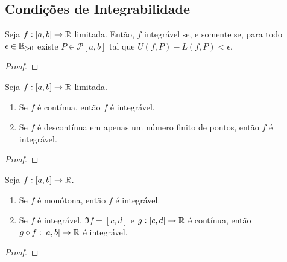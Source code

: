 \subsection{Condições de Integrabilidade}

\begin{theorem}
    Seja $f:[a,b] \to \mathbb{R}$ limitada. Então, $f$ integrável se, e somente se, para todo $\epsilon \in \mathbb{R}_{>0}$ existe $P \in \mathcal{P}[a,b]$ tal que $U(f,P) - L(f,P) < \epsilon$.
\end{theorem}

\begin{proof}
    \blackproof
\end{proof}

\begin{theorem}
    Seja $f:[a,b] \to \mathbb{R}$ limitada.
        \begin{enumerate}[leftmargin=*, align=left, label=\textbf{(\alph*)}]
            \item Se $f$ é contínua, então $f$ é integrável.
            \item Se $f$ é descontínua em apenas um número finito de pontos, então $f$ é integrável.
        \end{enumerate}
\end{theorem}

\begin{proof}
    \blackproof
\end{proof}

\begin{proposition}
    Seja $f:[a,b] \to \mathbb{R}$.
        \begin{enumerate}[leftmargin=*, align=left, label=\textbf{(\alph*)}]
            \item Se $f$ é monótona, então $f$ é integrável.
            \item Se $f$ é integrável, $\Im f = [c,d]$ e $g : [c,d] \to \mathbb{R}$ é contínua, então $g \circ f : [a,b] \to \mathbb{R}$ é integrável.
        \end{enumerate}
\end{proposition}

\begin{proof}
    \blackproof
\end{proof}

